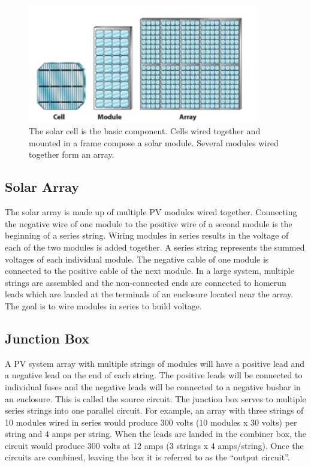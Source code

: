 \begin{figure}[H]
	\centering
	\includegraphics[width=10cm, keepaspectratio]{chapters/1_introduction/imgs/solarmodule.png}
	\caption{The solar cell is the basic component. Cells wired together
		and mounted in a frame compose a solar module. Several modules
		wired together form an array\cite{pvarizona}.}
	\label{fig:solmodule}
\end{figure}

\subsection{Solar Array}
The solar array is made up of multiple PV modules wired
together. Connecting the negative wire of one module to
the positive wire of a second module is the beginning of a
series string. Wiring modules in series results in the voltage of
each of the two modules is added together. A series string represents the summed voltages of each
individual module. The negative cable of one module is connected
to the positive cable of the next module. In a large system,
multiple strings are assembled and the non-connected ends are
connected to homerun leads which are landed at the terminals
of an enclosure located near the array.
The goal is to wire modules in series to build voltage.

\subsection{Junction Box}
A PV system array with multiple strings of modules will
have a positive lead and a negative lead on the end of each
string. The positive leads will be connected to individual
fuses and the negative leads will be connected to a negative
busbar in an enclosure. This is called the source circuit\cite{pvarizona}. The
junction box serves to  multiple series strings into
one parallel circuit. For example, an array with three strings
of 10 modules wired in series would produce 300 volts (10
modules x 30 volts) per string and 4 amps per string. When
the leads are landed in the combiner box, the circuit would
produce 300 volts at 12 amps (3 strings x 4 amps/string). Once
the circuits are combined, leaving the box it is referred to as
the “output circuit”.

